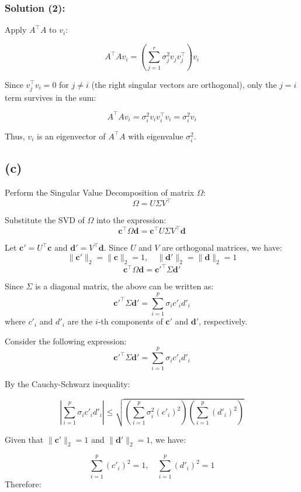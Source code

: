 \documentclass[12pt]{article}
\begin{document}
\subsubsection*{Solution (2):}


Apply \( A^\top A \) to \( v_i \):

\[
A^\top A v_i = \left( \sum_{j=1}^r \sigma_j^2 v_j v_j^\top \right) v_i
\]

Since \( v_j^\top v_i = 0 \) for \( j \neq i \) (the right singular vectors are orthogonal), only the \( j = i \) term survives in the sum:

\[
A^\top A v_i = \sigma_i^2 v_i v_i^\top v_i = \sigma_i^2 v_i
\]

Thus, \( v_i \) is an eigenvector of \( A^\top A \) with eigenvalue \( \sigma_i^2 \).

\subsection*{(c)}

Perform the Singular Value Decomposition of matrix \( \Omega \):
\[
\Omega = U \Sigma V^\top
\]

Substitute the SVD of \( \Omega \) into the expression:
\[
\mathbf{c}^\top \Omega \mathbf{d} = \mathbf{c}^\top U \Sigma V^\top \mathbf{d}
\]

Let \( \mathbf{c}' = U^\top \mathbf{c} \) and \( \mathbf{d}' = V^\top \mathbf{d} \). Since \( U \) and \( V \) are orthogonal matrices, we have:
\[
\|\mathbf{c}'\|_2 = \|\mathbf{c}\|_2 = 1, \quad \|\mathbf{d}'\|_2 = \|\mathbf{d}\|_2 = 1
\]
\[
\mathbf{c}^\top \Omega \mathbf{d} = \mathbf{c}'^\top \Sigma \mathbf{d}'
\]

Since \( \Sigma \) is a diagonal matrix, the above can be written as:
\[
\mathbf{c}'^\top \Sigma \mathbf{d}' = \sum_{i=1}^{p} \sigma_i c'_i d'_i
\]
where \( c'_i \) and \( d'_i \) are the \( i \)-th components of \( \mathbf{c}' \) and \( \mathbf{d}' \), respectively.

Consider the following expression:
\[
\mathbf{c}'^\top \Sigma \mathbf{d}' = \sum_{i=1}^{p} \sigma_i c'_i d'_i
\]

By the Cauchy-Schwarz inequality:

\[
\left| \sum_{i=1}^{p} \sigma_i c'_i d'_i \right| \leq \sqrt{ \left( \sum_{i=1}^{p} \sigma_i^2 (c'_i)^2 \right) \left( \sum_{i=1}^{p} (d'_i)^2 \right) }
\]

Given that \( \|\mathbf{c}'\|_2 = 1 \) and \( \|\mathbf{d}'\|_2 = 1 \), we have:

\[
\sum_{i=1}^{p} (c'_i)^2 = 1, \quad \sum_{i=1}^{p} (d'_i)^2 = 1
\]
Therefore:
\end{document}
